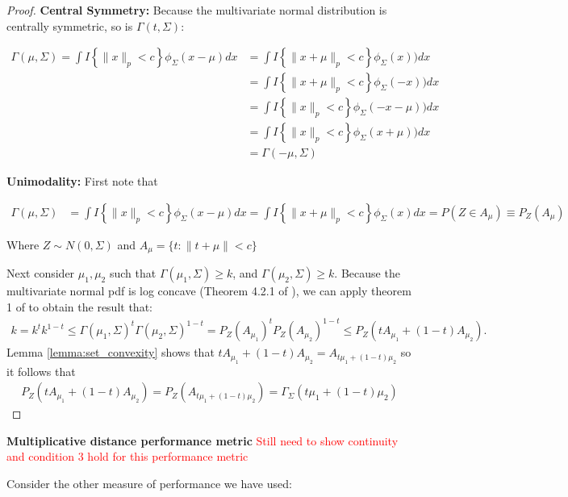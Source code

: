 \documentclass{article}
\begin{document}
\begin{proof}
\textbf{Central Symmetry:}
Because the multivariate normal distribution is centrally symmetric, so is $\Gamma(t, \Sigma)$:

\begin{align*}
	\Gamma(\mu, \Sigma) = \int I\left\{\|x\|_p < c\right\} \phi_{\Sigma}(x - \mu)dx &= \int I\left\{\|x + \mu\|_p < c\right\} \phi_{\Sigma}(x))dx \\
	&= \int I\left\{\|x + \mu\|_p < c\right\} \phi_{\Sigma}(-x))dx\\
	&= \int I\left\{\|x\|_p < c\right\} \phi_{\Sigma}(-x - \mu))dx\\
	&= \int I\left\{\|x\|_p < c\right\} \phi_{\Sigma}(x + \mu))dx\\
	&= \Gamma(-\mu, \Sigma)
\end{align*}

\textbf{Unimodality: }
First note that

\begin{align*}
	\Gamma(\mu, \Sigma) & = \int I\left\{\|x\|_p < c\right\} \phi_{\Sigma}(x - \mu)dx = \int I\left\{\|x + \mu\|_p < c\right\} \phi_{\Sigma}(x)dx = P(Z \in A_\mu) \equiv P_Z(A_\mu)
\end{align*}

Where $Z \sim N(0, \Sigma)$ and $A_\mu = \{t : \|t + \mu\| < c\}$

Next consider $\mu_1, \mu_2$ such that $\Gamma(\mu_1, \Sigma) \geq k$, and $\Gamma(\mu_2, \Sigma) \geq k$. Because the multivariate normal pdf is log concave (Theorem 4.2.1 of \citep{tong_multivariate_2012}), we can apply theorem 1 of \citep{rinott_convexity_1976} to obtain the result that:
\begin{align*}
	k = k^{t}k^{1 - t} \leq \Gamma(\mu_1, \Sigma)^t \Gamma(\mu_2, \Sigma)^{1 - t} =  P_Z(A_{\mu_1})^tP_Z(A_{\mu_2})^{1 - t} \leq P_Z(tA_{\mu_1} + (1 - t) A_{\mu_2}).
\end{align*}
Lemma \ref{lemma:set_convexity} shows that $tA_{\mu_1} + (1 - t) A_{\mu_2} = A_{t\mu_1 + (1 - t) \mu_2}$ so it follows that
\begin{align*}
	P_Z(tA_{\mu_1} + (1 - t) A_{\mu_2}) = P_Z(A_{t\mu_1 + (1 - t) \mu_2}) = \Gamma_{\Sigma}(t\mu_1 + (1 - t) \mu_2)
\end{align*}

\end{proof}

\textbf{Multiplicative distance performance metric}
\textcolor{red}{Still need to show continuity and condition 3 hold for this performance metric}

Consider the other measure of performance we have used: 
\end{document}
